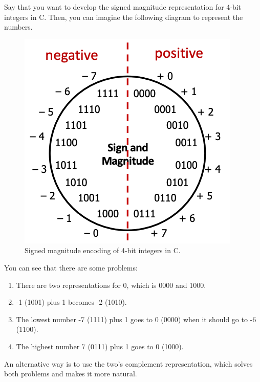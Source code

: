   \begin{example}
    Say that you want to develop the signed magnitude representation for 4-bit integers in C. Then, you can imagine the following diagram to represent the numbers. 
    \begin{figure}[H]
      \centering 
      \includegraphics[scale=0.4]{img/signed_magnitude_encoding.png}
      \caption{Signed magnitude encoding of 4-bit integers in C.} 
      \label{fig:signed_magnitude_encoding}
    \end{figure}
    You can see that there are some problems: 
    \begin{enumerate}
      \item There are two representations for $0$, which is 0000 and 1000. 
      \item -1 (1001) plus 1 becomes -2 (1010). 
      \item The lowest number -7 (1111) plus 1 goes to 0 (0000) when it should go to -6 (1100). 
      \item The highest number 7 (0111) plus 1 goes to 0 (1000). 
    \end{enumerate}
  \end{example}

  An alternative way is to use the two's complement representation, which solves both problems and makes it more natural. 

